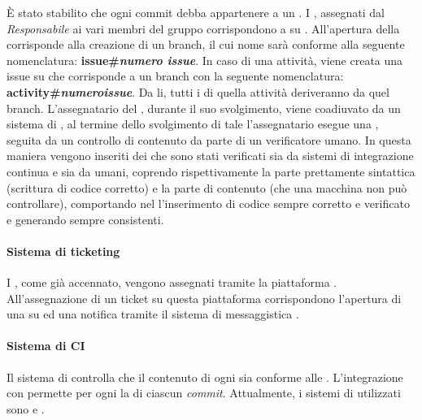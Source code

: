 È stato stabilito che ogni commit debba appartenere a un . I , assegnati dal \textit{Responsabile} ai vari membri del gruppo corrispondono a  su . All'apertura della  corrisponde alla creazione di un branch, il cui nome sarà conforme alla seguente nomenclatura: \textbf{issue\#\textit{numero issue}}. In caso di una attivit\`a, viene creata una issue su  che corrisponde a un branch con la seguente nomenclatura: \textbf{activity\#\textit{numeroissue}}. Da li, tutti i  di quella attivit\`a deriveranno da quel branch. L'assegnatario del , durante il suo svolgimento, viene coadiuvato da un sistema di , al termine dello svolgimento di tale  l'assegnatario esegue una , seguita da un controllo di contenuto da parte di un verificatore umano.
In questa maniera vengono inseriti dei  che sono stati verificati sia da sistemi di integrazione continua e sia da umani, coprendo rispettivamente la parte prettamente sintattica (scrittura di codice corretto) e la parte di contenuto (che una macchina non pu\`o controllare), comportando nel  l'inserimento di codice sempre corretto e verificato e generando  sempre consistenti.

\paragraph*{Sistema di ticketing} I , come già accennato, vengono assegnati tramite la piattaforma . All'assegnazione di un ticket su questa piattaforma corrispondono l'apertura di una  su  ed una notifica tramite il sistema di messaggistica .

\paragraph*{Sistema di CI}Il sistema di  controlla che il contenuto di ogni  sia conforme alle \NormeDiProgetto. L'integrazione con  permette per ogni  la  di ciascun \textit{commit}. Attualmente, i sistemi di  utilizzati sono  e .

